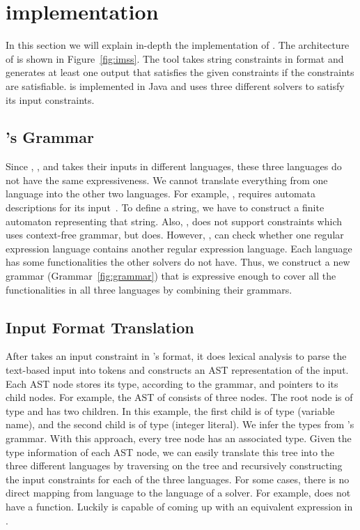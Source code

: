\section{implementation}
\label{sec:implementation}
In this section we will explain in-depth the implementation of \imss.
The architecture of \imss is shown
in Figure~\ref{fig:imss}. The tool takes string constraints in \imss format
and generates at least one output that satisfies the given constraints if the constraints are satisfiable.
\imss is implemented in Java and uses three different solvers to satisfy its input constraints.


\subsection{\imss's Grammar}
Since \hampi, \dprle, and \zstr takes their inputs in
 different languages, these three languages do not have the same expressiveness.
 We cannot translate everything from one language into the other two languages. For example,
 \dprle, requires automata descriptions for its input~\cite{lazystrings2010}.
 To define a string, we have to construct a finite automaton representing that string.
 Also, \dprle, does not support constraints which uses context-free grammar,
 but \hampi does. However, \dprle, can check whether one regular expression language
 contains another regular expression language. Each language has some functionalities the
 other solvers do not have. Thus, we construct a new grammar (Grammar~\ref{fig:grammar}) that is expressive enough to
 cover all the functionalities in all three languages by combining their grammars.

\subsection{Input Format Translation}
After \imss takes an input constraint in \imss's format, it does lexical analysis to parse
the text-based input into tokens and constructs an AST representation of the input.
Each AST node stores its type, according to the grammar, and pointers to its child nodes.
For example, the AST of  consists of three nodes. The root node is of type
 and has two children. In this example, the first child is of type  (variable name), and
the second child is of type  (integer literal). We infer the types from \imss's grammar.
With this approach, every tree node has an associated type. Given the type information of
each AST node, we can easily translate this tree into the three different languages by traversing
on the tree and recursively constructing the input constraints for each of the three languages.
For some cases, there is no direct mapping from \imss language to the language of
a solver.
For example, \dprle does not have a  function. Luckily \imss is capable of coming up with an equivalent
expression in \dprle.

